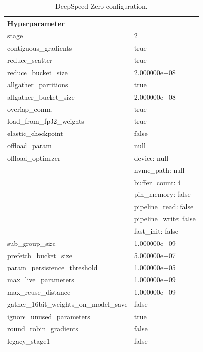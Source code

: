 \begin{table}
    \def\arraystretch{1.5}
    \small
    \centering
    \caption{DeepSpeed Zero configuration.}
    \label{tab:deepspeed-config}
    \begin{tabularx}{\textwidth}{XX}
        \toprule
        \textbf{Hyperparameter} & \\
        \midrule
        stage & 2\\
        contiguous\_gradients & true\\
        reduce\_scatter & true\\
        reduce\_bucket\_size & 2.000000e+08\\
        allgather\_partitions & true\\
        allgather\_bucket\_size & 2.000000e+08\\
        overlap\_comm & true\\
        load\_from\_fp32\_weights & true\\
        elastic\_checkpoint & false\\
        offload\_param & null\\
        \midrule
        offload\_optimizer & device: null\\
        & nvme\_path: null\\
        & buffer\_count: 4\\
        & pin\_memory: false\\
        & pipeline\_read: false\\
        & pipeline\_write: false\\
        & fast\_init: false\\
        \midrule
        sub\_group\_size & 1.000000e+09\\
        prefetch\_bucket\_size & 5.000000e+07\\
        param\_persistence\_threshold & 1.000000e+05\\
        max\_live\_parameters & 1.000000e+09\\
        max\_reuse\_distance & 1.000000e+09\\
        gather\_16bit\_weights\_on\_model\_save & false\\
        ignore\_unused\_parameters & true\\
        round\_robin\_gradients & false\\
        legacy\_stage1 & false\\
        \bottomrule
    \end{tabularx}
\end{table}

